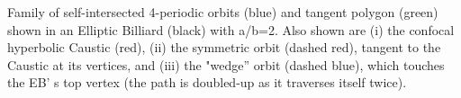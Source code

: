 Family of self-intersected 4-periodic orbits (blue) and tangent polygon (green) shown in an Elliptic Billiard (black) with a/b=2. Also shown are (i) the confocal hyperbolic Caustic (red), (ii) the symmetric orbit (dashed red), tangent to the Caustic at its vertices, and (iii) the "wedge'' orbit (dashed blue), which touches the EB' s top vertex (the path is doubled-up as it traverses itself twice).